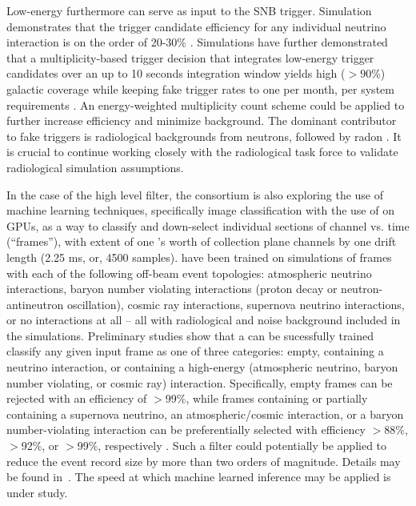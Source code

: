 Low-energy  furthermore can serve as input to the
SNB trigger. Simulation demonstrates that the trigger candidate
efficiency for any individual  neutrino interaction is on the order
of 20-30\% \cite{pierre}. Simulations have further demonstrated that a
multiplicity-based  trigger decision that integrates low-energy
trigger candidates over an up to 10 seconds
integration window yields high ($>90$\%) galactic coverage while
keeping fake  trigger rates to one per month, per system
requirements \cite{pierre}. An energy-weighted multiplicity count scheme could be
applied to further increase efficiency and minimize background.
The dominant contributor to fake  triggers is
radiological backgrounds from neutrons, followed by radon \cite{rad}. It is
crucial to continue working closely with the radiological task force
to validate radiological simulation assumptions.

In the case of the high level filter, the consortium is also exploring the
use of machine learning techniques, specifically image classification
with the use of  on GPUs, as a way to
classify and down-select individual sections of  channel vs. time
(``frames''), with extent of one 's worth of collection plane
channels by one drift length (2.25 ms, or, 4500 samples).  have
been trained on  simulations of frames with each of
the following off-beam event topologies: 
atmospheric neutrino interactions, baryon number violating
interactions (proton decay or neutron-antineutron oscillation), cosmic
ray interactions, supernova neutrino interactions, or no interactions at all -- all
with radiological and noise background included in the
simulations. Preliminary studies show that a  can be sucessfully trained classify any
given input frame as one of three categories: empty, containing a  neutrino
interaction, or containing a high-energy (atmospheric neutrino, baryon
number violating, or cosmic ray) interaction. Specifically, empty frames can be
rejected with an efficiency of $>$99\%, while frames containing or
partially containing 
a supernova neutrino, an atmospheric/cosmic interaction, or a baryon
number-violating interaction can be preferentially selected with efficiency
$>$88\%, $>$92\%, or $>$99\%, respectively  \cite{bib:docdb11311}. Such a 
filter could potentially be applied to reduce the event record size by
more than two orders of magnitude. Details may be found in~.
The speed at which machine learned inference may be applied is under study.


